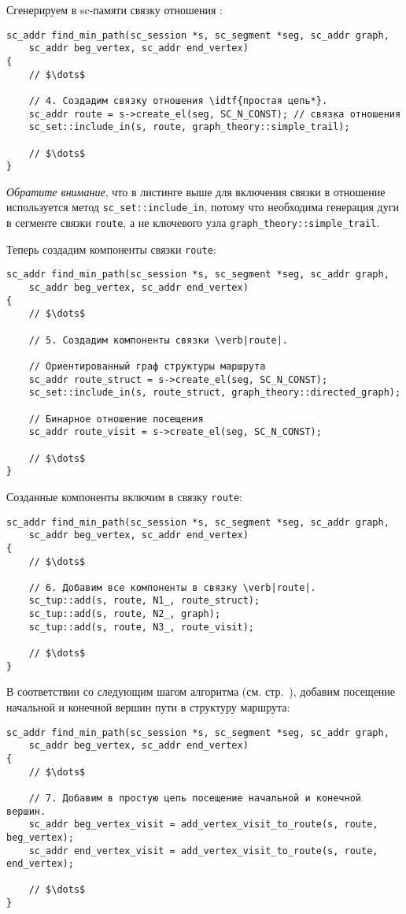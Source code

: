 Сгенерируем в sc-памяти связку отношения :
\begin{lstlisting}[texcl]
sc_addr find_min_path(sc_session *s, sc_segment *seg, sc_addr graph,
    sc_addr beg_vertex, sc_addr end_vertex)
{
    // $\dots$

    // 4. Создадим связку отношения \idtf{простая цепь*}.
    sc_addr route = s->create_el(seg, SC_N_CONST); // связка отношения
    sc_set::include_in(s, route, graph_theory::simple_trail);

    // $\dots$
}
\end{lstlisting}

\emph{Обратите внимание}, что в листинге выше для включения связки в
отношение используется метод \lstinline|sc_set::include_in|, потому
что необходима генерация дуги в сегменте связки \lstinline|route|, а
не ключевого узла \lstinline|graph_theory::simple_trail|.

Теперь создадим компоненты связки \lstinline|route|:
\begin{lstlisting}[texcl]
sc_addr find_min_path(sc_session *s, sc_segment *seg, sc_addr graph,
    sc_addr beg_vertex, sc_addr end_vertex)
{
    // $\dots$

    // 5. Создадим компоненты связки \verb|route|.
    
    // Ориентированный граф структуры маршрута
    sc_addr route_struct = s->create_el(seg, SC_N_CONST);
    sc_set::include_in(s, route_struct, graph_theory::directed_graph);
    
    // Бинарное отношение посещения
    sc_addr route_visit = s->create_el(seg, SC_N_CONST);

    // $\dots$
}
\end{lstlisting}

Созданные компоненты включим в связку \lstinline|route|:
\begin{lstlisting}[texcl]
sc_addr find_min_path(sc_session *s, sc_segment *seg, sc_addr graph,
    sc_addr beg_vertex, sc_addr end_vertex)
{
    // $\dots$

    // 6. Добавим все компоненты в связку \verb|route|.
    sc_tup::add(s, route, N1_, route_struct);
    sc_tup::add(s, route, N2_, graph);
    sc_tup::add(s, route, N3_, route_visit);

    // $\dots$
}
\end{lstlisting}

В соответствии со следующим шагом алгоритма
(см. стр.~\pageref{S9_Add_begin_and_end_vertexes_visit_to_route_tuple}),
добавим посещение начальной и конечной вершин пути в структуру
маршрута:
\begin{lstlisting}[texcl]
sc_addr find_min_path(sc_session *s, sc_segment *seg, sc_addr graph,
    sc_addr beg_vertex, sc_addr end_vertex)
{
    // $\dots$

    // 7. Добавим в простую цепь посещение начальной и конечной вершин.
    sc_addr beg_vertex_visit = add_vertex_visit_to_route(s, route, beg_vertex);
    sc_addr end_vertex_visit = add_vertex_visit_to_route(s, route, end_vertex);

    // $\dots$
}
\end{lstlisting}



